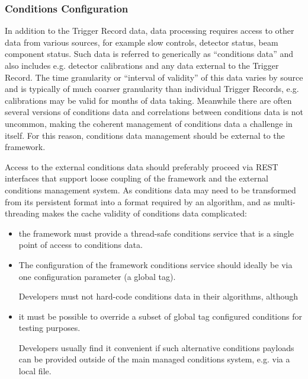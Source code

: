 \documentclass[../main-v1.tex]{subfiles}
\begin{document}
\subsubsection{Conditions Configuration}

In addition to the Trigger Record data, data processing requires access to other data from various sources, for example slow controls, detector status, beam component status.  Such data is referred to generically as “conditions data” and also includes e.g. detector calibrations and any data external to the Trigger Record.  The time granularity or “interval of validity” of this data varies by source and is typically of much coarser granularity than individual Trigger Records, e.g. calibrations may be valid for months of data taking.  Meanwhile there are often several versions of conditions data and correlations between conditions data is not uncommon, making the coherent management of conditions data a challenge in itself.  For this reason, conditions data management should be external to the framework.

Access to the external conditions data should preferably proceed via REST interfaces that support loose coupling of the framework and the external conditions management system.  As conditions data may need to be transformed from its persistent format into a format required by an algorithm, and as multi-threading makes the cache validity of conditions data complicated: 

\begin{itemize}
\item the framework must provide a thread-safe conditions service that is a single point of access to conditions data.  

\item The configuration of the framework conditions service should ideally be via one configuration parameter (a global tag). 

Developers must not hard-code conditions data in their algorithms, although 

\item it must be possible to override a subset of global tag configured conditions for testing purposes.  

Developers usually find it convenient if such alternative conditions payloads can be provided outside of the main managed conditions system, e.g. via a local file.
\end{itemize}
\end{document}
